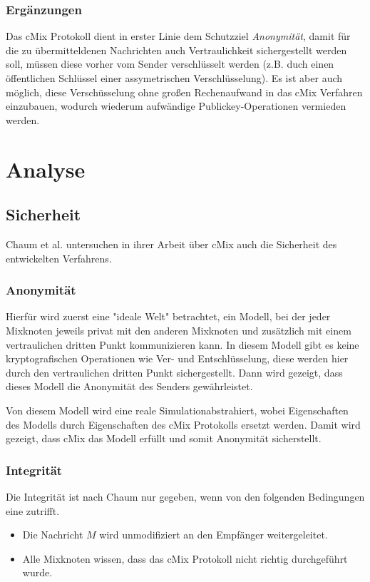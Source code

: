 \documentclass[
    fontsize=12pt,
    headings=small,
    parskip=half,           %
    bibliography=totoc,
    numbers=noenddot,       %
    open=any,               %
    ]{scrreprt}
\begin{document}
\subsubsection{Ergänzungen}

Das cMix Protokoll dient in erster Linie dem Schutzziel \textit{Anonymität},
damit für die zu übermitteldenen Nachrichten auch Vertraulichkeit sichergestellt werden soll, müssen diese vorher vom Sender verschlüsselt werden (z.B. duch einen öffentlichen Schlüssel einer assymetrischen Verschlüsselung).
Es ist aber auch möglich, diese Verschüsselung ohne großen Rechenaufwand in das cMix Verfahren einzubauen, wodurch wiederum aufwändige Publickey-Operationen vermieden werden.


\section{Analyse}


\subsection{Sicherheit}

Chaum et al. untersuchen in ihrer Arbeit über cMix auch die Sicherheit des entwickelten Verfahrens.

\subsubsection{Anonymität}

Hierfür wird zuerst eine "ideale Welt" betrachtet, ein Modell, bei der jeder Mixknoten jeweils privat mit den anderen Mixknoten und zusätzlich mit einem vertraulichen dritten Punkt kommunizieren kann.
In diesem Modell gibt es keine kryptografischen Operationen wie Ver- und Entschlüsselung, diese werden hier durch den vertraulichen dritten Punkt sichergestellt.
Dann wird gezeigt, dass dieses Modell die Anonymität des Senders gewährleistet.

Von diesem Modell wird eine \glqq reale Simulation\grqq abstrahiert, wobei Eigenschaften des Modells durch Eigenschaften des cMix Protokolls ersetzt werden.
Damit wird gezeigt, dass cMix das Modell erfüllt und somit Anonymität sicherstellt.

\subsubsection{Integrität}

Die Integrität ist nach Chaum nur gegeben, wenn von den folgenden Bedingungen eine zutrifft.
\begin{itemize}
\item Die Nachricht $M$ wird unmodifiziert an den Empfänger weitergeleitet.
\item Alle Mixknoten wissen, dass das cMix Protokoll nicht richtig durchgeführt wurde.
\end{itemize}
\end{document}
